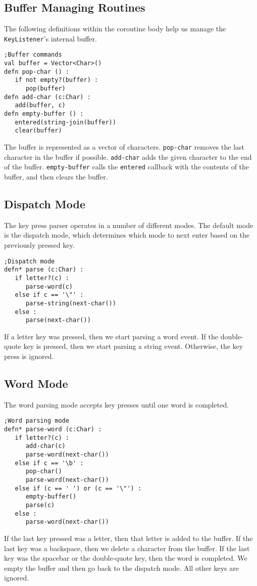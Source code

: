 \documentclass[10pt,oneside]{book}
\begin{document}
\subsection*{Buffer Managing Routines}
The following definitions within the coroutine body help us manage the \texttt{\frenchspacing KeyListener}'s internal buffer.
\begin{lstlisting}
;Buffer commands
val buffer = Vector<Char>()
defn pop-char () :
   if not empty?(buffer) :
      pop(buffer)
defn add-char (c:Char) :
   add(buffer, c)
defn empty-buffer () :
   entered(string-join(buffer))
   clear(buffer)
\end{lstlisting}
The buffer is represented as a vector of characters. \texttt{\frenchspacing pop-char} removes the last character in the buffer if possible. \texttt{\frenchspacing add-char} adds the given character to the end of the buffer. \texttt{\frenchspacing empty-buffer} calls the \texttt{\frenchspacing entered} callback with the contents of the buffer, and then clears the buffer.

\subsection*{Dispatch Mode}
The key press parser operates in a number of different modes. The default mode is the dispatch mode, which determines which mode to next enter based on the previously pressed key. 
\begin{lstlisting}
;Dispatch mode
defn* parse (c:Char) :
   if letter?(c) :
      parse-word(c)
   else if c == '\"' :
      parse-string(next-char())
   else :
      parse(next-char())
\end{lstlisting}
If a letter key was pressed, then we start parsing a word event. If the double-quote key is pressed, then we start parsing a string event. Otherwise, the key press is ignored.

\subsection*{Word Mode}
The word parsing mode accepts key presses until one word is completed.
\begin{lstlisting}
;Word parsing mode
defn* parse-word (c:Char) :
   if letter?(c) :
      add-char(c)
      parse-word(next-char())
   else if c == '\b' :
      pop-char()
      parse-word(next-char())
   else if (c == ' ') or (c == '\"') :
      empty-buffer()
      parse(c)
   else :
      parse-word(next-char())
\end{lstlisting}
If the last key pressed was a letter, then that letter is added to the buffer. If the last key was a backspace, then we delete a character from the buffer. If the last key was the spacebar or the double-quote key, then the word is completed. We empty the buffer and then go back to the dispatch mode. All other keys are ignored.
\end{document}
